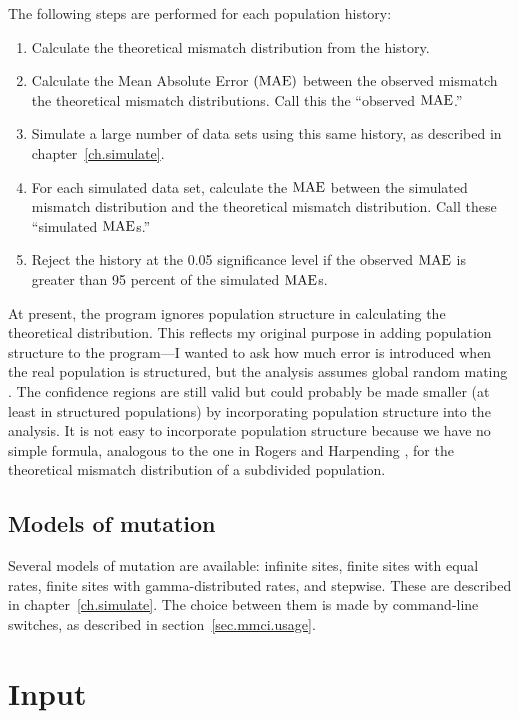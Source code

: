 The following steps are performed for each population history:
\begin{enumerate}
\item Calculate the theoretical mismatch distribution from the
history.

\item Calculate the Mean Absolute Error $(\hbox{MAE})$ between the observed
mismatch the theoretical mismatch distributions.  Call this the
``observed $\hbox{MAE}$.''

\item Simulate a large number of data sets using this same history, as
described in chapter~\ref{ch.simulate}.

\item For each simulated data set, calculate the $\hbox{MAE}$ between the
simulated mismatch distribution and the theoretical mismatch
distribution.  Call these ``simulated $\hbox{MAE}$s.''

\item Reject the history at the 0.05 significance level if the
observed $\hbox{MAE}$ is greater than 95 percent of the simulated $\hbox{MAE}$s. 
\end{enumerate}
At present, the program ignores population structure in calculating
the theoretical distribution.  This reflects my original purpose in
adding population structure to the program---I wanted to ask how much
error is introduced when the real population is structured, but the
analysis assumes global random mating \cite{Rogers:PPG-97-55}.  The
confidence regions are still valid but could probably be made smaller
(at least in structured populations) by incorporating population
structure into the analysis.  It is not easy to incorporate population
structure because we have no simple formula, analogous to the one in
Rogers and Harpending \cite{Rogers:MBE-9-552}, for the theoretical
mismatch distribution of a subdivided population.

\subsection{Models of mutation\label{sec.mmci.mutation}}

Several models of mutation are available: infinite sites, finite sites
with equal rates, finite sites with gamma-distributed rates, and
stepwise.  These are described in chapter~\ref{ch.simulate}.
The choice between them is made by command-line switches, as described
in section~\ref{sec.mmci.usage}.

\section{Input}

